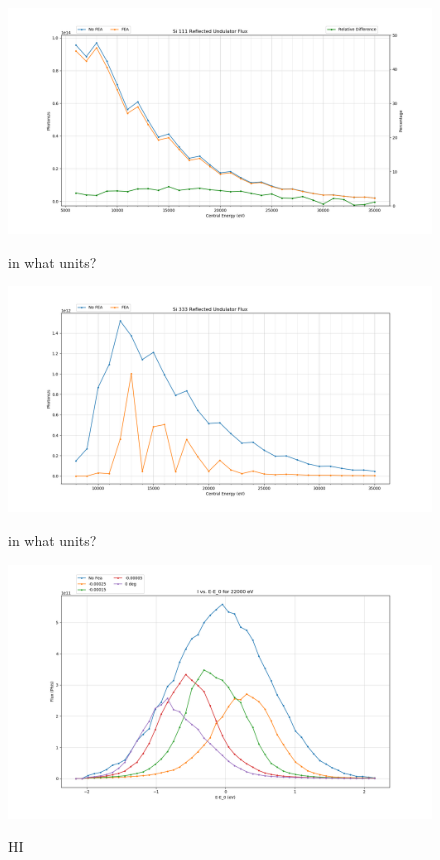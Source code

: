 \documentclass[preprint]{iucr}              %
\begin{document}
\begin{figure}
\caption{in what units?}
\includegraphics{images/ivu111flux.png}
\label{fig:ivu111flux}
\end{figure}

\begin{figure}
\caption{in what units?}
\includegraphics{images/ivu333flux.png}
\label{fig:ivu333flux}
\end{figure}

\begin{figure}
\caption{HI}
\includegraphics{images/22kevangle.png}
\label{fig:22kevangle}
\end{figure}
\end{document}
